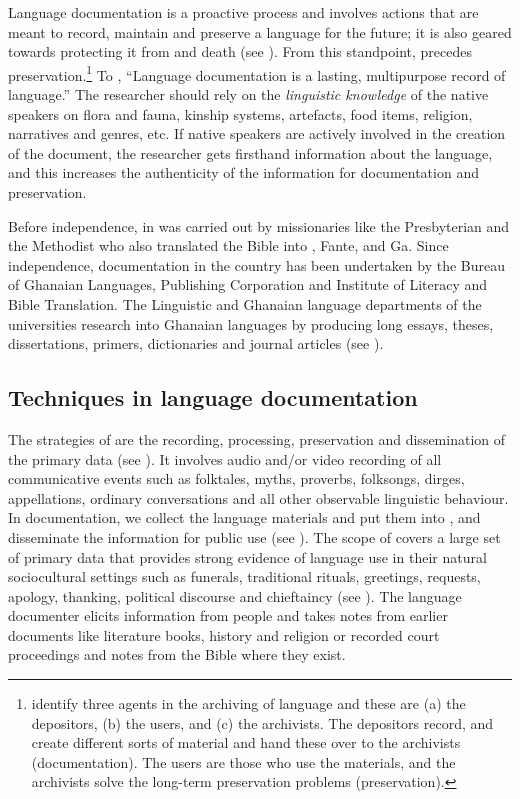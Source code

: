 \documentclass[output=paper,
modfonts
]{langscibook}
\begin{document}
Language documentation is a proactive process and involves actions that are meant to record, maintain and preserve a language for the future; it is also geared towards protecting it from  and death (see \citealt{Agyekum2012}). From this standpoint,  precedes preservation.\footnote{\citet[3140]{Trilsbeek2006} identify three agents in the archiving of language and these are (a) the depositors, (b) the users, and (c) the archivists. The depositors record, and create different sorts of material and hand these over to the archivists (documentation). The users are those who use the materials, and the archivists solve the long-term preservation problems (preservation).}{ }To \citet[1]{Himmelmann2006}, “Language documentation is a lasting, multipurpose record of language.” The researcher should rely on the \textit{linguistic knowledge }of the native speakers on flora and fauna, kinship systems, artefacts, food items, religion, narratives and  genres, etc. If native speakers are actively involved in the creation of the document, the researcher gets firsthand information about the language, and this increases the authenticity of the information for documentation and preservation. 

Before independence,  in  was carried out by missionaries like the Presbyterian and the Methodist who also translated the Bible into , Fante,  and Ga. Since independence, documentation in the country has been undertaken by the Bureau of Ghanaian Languages,  Publishing Corporation and  Institute of Literacy and Bible Translation. The Linguistic and Ghanaian language departments of the universities research into Ghanaian languages by producing long essays, theses, dissertations, primers, dictionaries and journal articles (see \citealt{Agyekum2012}). 

\subsection{Techniques in language documentation}

The  strategies of  are the recording, processing, preservation and dissemination of the primary data (see \citealt[159]{Woodbury2011}). It involves audio and/or video recording of all communicative events such as folktales, myths, proverbs, folksongs, dirges, appellations, ordinary conversations and all other observable linguistic behaviour. In documentation, we collect the language materials and put them into , and disseminate the information for public use (see \citealt[106]{Salffner2006}). The scope of  covers a large set of primary data that provides strong evidence of language use in their natural sociocultural settings such as funerals, traditional rituals, greetings, requests, apology, thanking, political discourse and chieftaincy (see \citealt{Agyekum2012}). The language documenter elicits information from people and takes notes from earlier documents like literature books, history and religion or recorded court proceedings and notes from the Bible where they exist.
\end{document}
